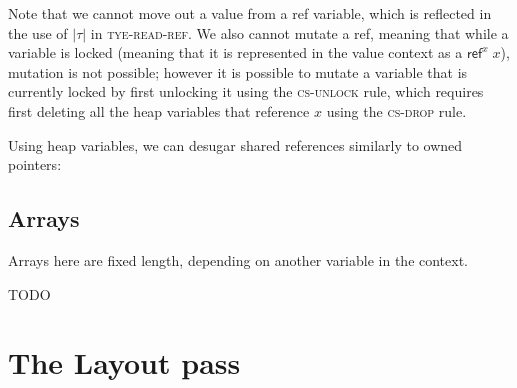\documentclass[acmsmall,nonacm]{acmart}
\DeclareMathOperator*{\Sep}{\scalerel*{\ast}{\sum}}
\newcommand*{\N}{\mathbb{N}}
\newcommand{\core}[1]{\left| #1 \right|}
\newcommand{\proves}{\vdash}
\begin{document}
Note that we cannot move out a value from a ref variable, which is reflected in the use of $\core\tau$ in \textsc{tye-read-ref}. We also cannot mutate a ref, meaning that while a variable is locked (meaning that it is represented in the value context as a $\mathsf{ref}^x\;x$), mutation is not possible; however it is possible to mutate a variable that is currently locked by first unlocking it using the \textsc{cs-unlock} rule, which requires first deleting all the heap variables that reference $x$ using the \textsc{cs-drop} rule.

Using heap variables, we can desugar shared references similarly to owned pointers:


\subsection{Arrays}\label{sec:arrays}

Arrays here are fixed length, depending on another variable in the context.


TODO

\section{The Layout pass}\label{sec:layout}
\end{document}
